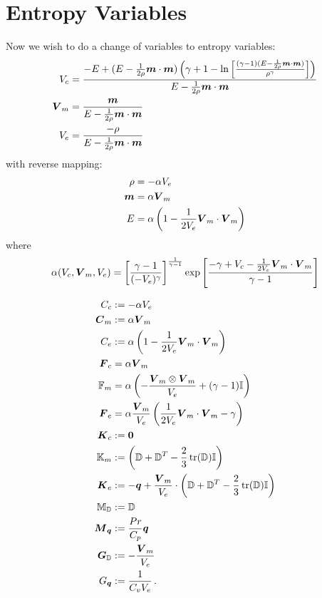 \documentclass[Dissertation.tex]{subfiles}
\begin{document}
\section{Entropy Variables}
Now we wish to do a change of variables to entropy variables:
\begin{align*}
V_c&=\frac{-E+(E-\frac{1}{2\rho}\boldsymbol m\cdot\boldsymbol m)\left( \gamma+1-\ln\left[ \frac{(\gamma-1)(E-\frac{1}{2\rho}\boldsymbol m\cdot\boldsymbol m)}{\rho^\gamma} \right] \right)}
{E-\frac{1}{2\rho}\boldsymbol m\cdot\boldsymbol m}\\
\boldsymbol V_m&=\frac{\boldsymbol m}{E-\frac{1}{2\rho}\boldsymbol m\cdot\boldsymbol m}\\
V_e&=\frac{-\rho}{E-\frac{1}{2\rho}\boldsymbol m\cdot\boldsymbol m}\\
\end{align*}
with reverse mapping:
\begin{align*}
\rho&=-\alpha V_e\\
\boldsymbol m&=\alpha\boldsymbol V_m\\
E&=\alpha\left( 1-\frac{1}{2V_e}\boldsymbol V_m\cdot\boldsymbol V_m \right)\\
\end{align*}
where 
\[
\alpha(V_c,\boldsymbol V_m,V_e)=\left[ \frac{\gamma-1}{(-V_e)^\gamma} \right]^{\frac{1}{\gamma-1}}\exp\left[ \frac{-\gamma+V_c-\frac{1}{2V_e}\boldsymbol V_m\cdot\boldsymbol V_m}{\gamma-1} \right]
\]

\begin{align*}
C_c&:=-\alpha V_e\\
\boldsymbol C_m&:=\alpha\boldsymbol V_m\\
C_e&:=\alpha\left( 1-\frac{1}{2V_e}\boldsymbol V_m\cdot\boldsymbol V_m \right)\\
\boldsymbol F_c&=\alpha\boldsymbol V_m\\
\mathbb{F}_m&=\alpha\left( -\frac{\boldsymbol V_m\otimes\boldsymbol V_m}{V_e}+(\gamma-1)\mathbb{I} \right)\\
\boldsymbol F_e&=\alpha\frac{\boldsymbol V_m}{V_e}\left( \frac{1}{2V_e}\boldsymbol V_m\cdot\boldsymbol V_m-\gamma \right)\\
\boldsymbol K_c&:=\boldsymbol 0\\
\mathbb{K}_m&:=\left( \mathbb{D}+\mathbb{D}^T-\frac{2}{3}\operatorname*{tr}(\mathbb{D})\mathbb{I} \right)\\
\boldsymbol K_e&:=-\boldsymbol q+\frac{\boldsymbol V_m}{V_e}\cdot\left( \mathbb{D}+\mathbb{D}^T-\frac{2}{3}\operatorname*{tr}(\mathbb{D})\mathbb{I} \right)\\
\mathbb{M}_{\mathbb{D}}&:=\mathbb{D}\\
\boldsymbol M_{\boldsymbol q}&:=\frac{Pr}{C_p}\boldsymbol q\\
\boldsymbol G_{\mathbb{D}}&:=-\frac{\boldsymbol V_m}{V_e}\\
G_{\boldsymbol q}&:=\frac{1}{C_vV_e}\,.
\end{align*}
\end{document}
